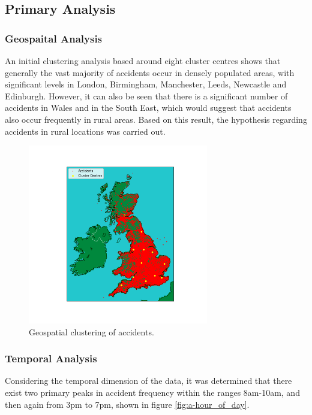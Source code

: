 \documentclass[12pt]{article}
\begin{document}
\subsection{Primary Analysis}

\subsubsection{Geospaital Analysis}

An initial clustering analysis based around eight cluster centres shows that generally the vast majority of accidents occur in densely populated areas, with significant levels in London, Birmingham, Manchester, Leeds, Newcastle and Edinburgh. However, it can also be seen that there is a significant number of accidents in Wales and in the South East, which would suggest that accidents also occur frequently in rural areas. Based on this result, the hypothesis regarding accidents in rural locations was carried out.

\begin{figure}[ht]
\centering     %
\includegraphics[width=0.70\textwidth]{accident_clusters}
\caption{Geospatial clustering of accidents.}
\end{figure}

\newpage

\subsubsection{Temporal Analysis}

Considering the temporal dimension of the data, it was determined that there exist two primary peaks in accident frequency within the ranges 8am-10am, and then again from 3pm to 7pm, shown in figure \ref{fig:a-hour_of_day}.
\end{document}
